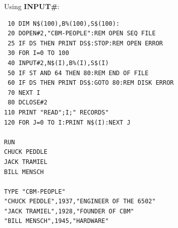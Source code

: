 \begin{description}[leftmargin=2cm,style=nextline]
\item [Example:] Using {\bf INPUT\#}:
\begin{tcolorbox}[colback=black,coltext=white]
\verbatimfont{\codefont}
\begin{verbatim}
 10 DIM N$(100),B%(100),S$(100):
 20 DOPEN#2,"CBM-PEOPLE":REM OPEN SEQ FILE
 25 IF DS THEN PRINT DS$:STOP:REM OPEN ERROR
 30 FOR I=0 TO 100
 40 INPUT#2,N$(I),B%(I),S$(I)
 50 IF ST AND 64 THEN 80:REM END OF FILE
 60 IF DS THEN PRINT DS$:GOTO 80:REM DISK ERROR
 70 NEXT I
 80 DCLOSE#2
110 PRINT "READ";I;" RECORDS"
120 FOR J=0 TO I:PRINT N$(I):NEXT J

RUN
CHUCK PEDDLE
JACK TRAMIEL
BILL MENSCH

TYPE "CBM-PEOPLE"
"CHUCK PEDDLE",1937,"ENGINEER OF THE 6502"
"JACK TRAMIEL",1928,"FOUNDER OF CBM"
"BILL MENSCH",1945,"HARDWARE"

\end{verbatim}
\end{tcolorbox}
\end{description}


\newpage
